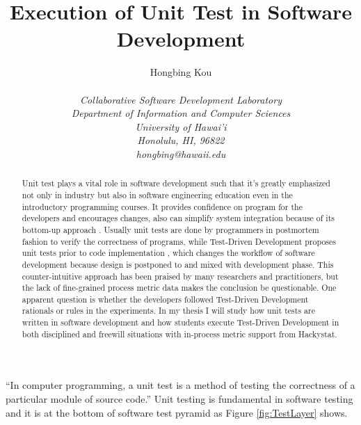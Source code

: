\documentclass[11pt,twocolumn]{article}
\begin{document}
\title{Execution of Unit Test in Software Development}
\author{\protect\begin{tabular}{ccc}
Hongbing Kou\\
\end{tabular}\\
\em Collaborative Software Development Laboratory\\
\em Department of Information and Computer Sciences\\
\em University of Hawai'i\\
\em Honolulu, HI, 96822\\
\em hongbing@hawaii.edu}
\maketitle
\thispagestyle{empty}

\begin{abstract}
  Unit test plays a vital role in software development such that it's
  greatly emphasized not only in industry but also in software engineering
  education even in the introductory programming courses. It provides
  confidence on program for the developers and encourages changes, also can
  simplify system integration because of its bottom-up approach
  \cite{UnitTestWiki}. Usually unit tests are done by programmers in
  postmortem fashion to verify the correctness of programs, while
  Test-Driven Development proposes unit tests prior to code implementation
  , which changes the workflow of software development because design is
  postponed to and mixed with development phase. This counter-intuitive
  approach has been praised by many researchers and practitioners, but the
  lack of fine-grained process metric data makes the conclusion be
  questionable. One apparent question is whether the developers followed
  Test-Driven Development rationals or rules in the experiments.  In my
  thesis I will study how unit tests are written in software development
  and how students execute Test-Driven Development in both disciplined and
  freewill situations with in-process metric support from Hackystat.
\end{abstract}


\label{sec:intro}
  
``In computer programming, a unit test is a method of testing the
  correctness of a particular module of source code.'' \cite{UnitTestWiki}
 Unit testing is fundamental in software testing and it is at the bottom
 of software test pyramid as Figure  \ref{fig:TestLayer} shows.
\end{document}
